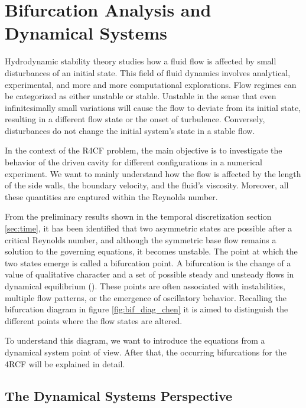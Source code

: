 
\section{Bifurcation Analysis and Dynamical Systems} \label{sec:bif}

Hydrodynamic stability theory studies how a fluid flow is affected by small
disturbances of an initial state. This field of fluid dynamics involves
analytical, experimental, and more and more computational explorations. Flow
regimes can be categorized as either unstable or stable. Unstable in the sense
that even infinitesimally small variations will cause the flow to deviate from
its initial state, resulting in a different flow state or the onset of
turbulence. Conversely, disturbances do not change the initial system's state
in a stable flow.

In the context of the R4CF problem, the main objective is to investigate the
behavior of the driven cavity for different configurations in a numerical
experiment. We want to mainly understand how the flow is affected by the length
of the side walls, the boundary velocity, and the fluid's viscosity. Moreover,
all these quantities are captured within the Reynolds number.

From the preliminary results shown in the temporal discretization section
\ref{sec:time}, it has been identified that two asymmetric states are possible
after a critical Reynolds number, and although the symmetric base flow remains
a solution to the governing equations, it becomes unstable. The point at which
the two states emerge is called a bifurcation point. A bifurcation is the
change of a value of qualitative character and a set of possible steady and
unsteady flows in dynamical equilibrium (\citeauthor{drazin2002}). These points
are often associated with instabilities, multiple flow patterns, or the
emergence of oscillatory behavior. Recalling the bifurcation diagram in figure
\ref{fig:bif_diag_chen} it is aimed to distinguish the different points where
the flow states are altered. 

To understand this diagram, we want to introduce the equations from a dynamical
system point of view. After that, the occurring bifurcations for the 4RCF will
be explained in detail.

\subsection{The Dynamical Systems Perspective}

